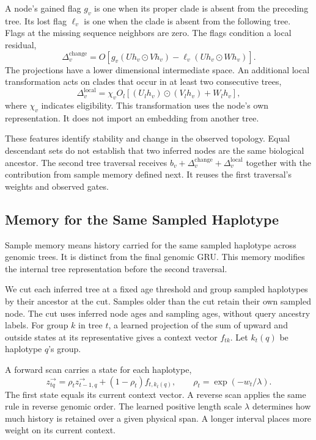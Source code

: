 \documentclass[letterpaper]{article}
\begin{document}
A node's gained flag $g_v$ is one when its proper clade is absent from the preceding tree. Its lost flag $\ell_v$ is one when the clade is absent from the following tree. Flags at the missing sequence neighbors are zero. The flags condition a local residual,
\begin{equation}
\Delta_v^{\mathrm{change}}=
O\!\left[
g_v(Uh_v\odot Vh_v)
-\ell_v(Uh_v\odot Wh_v)
\right].
\label{eq:change}
\end{equation}
The projections have a lower dimensional intermediate space. An additional local transformation acts on clades that occur in at least two consecutive trees,
\begin{equation}
\Delta_v^{\mathrm{local}}=
\chi_v O_l\!\left[(U_lh_v)\odot(V_lh_v)+W_lh_v\right],
\label{eq:local}
\end{equation}
where $\chi_v$ indicates eligibility. This transformation uses the node's own representation. It does not import an embedding from another tree.

These features identify stability and change in the observed topology. Equal descendant sets do not establish that two inferred nodes are the same biological ancestor. The second tree traversal receives $b_v+\Delta_v^{\mathrm{change}}+\Delta_v^{\mathrm{local}}$ together with the contribution from sample memory defined next. It reuses the first traversal's weights and observed gates.

\subsection{Memory for the Same Sampled Haplotype}
Sample memory means history carried for the same sampled haplotype across genomic trees. It is distinct from the final genomic GRU. This memory modifies the internal tree representation before the second traversal.

We cut each inferred tree at a fixed age threshold and group sampled haplotypes by their ancestor at the cut. Samples older than the cut retain their own sampled node. The cut uses inferred node ages and sampling ages, without query ancestry labels. For group $k$ in tree $t$, a learned projection of the sum of upward and outside states at its representative gives a context vector $f_{tk}$. Let $k_t(q)$ be haplotype $q$'s group.

A forward scan carries a state for each haplotype,
\begin{equation}
z^\rightarrow_{tq}
=\rho_t z^\rightarrow_{t-1,q}
 +(1-\rho_t)f_{t,k_t(q)},
\qquad
\rho_t=\exp(-w_t/\lambda).
\label{eq:memory}
\end{equation}
The first state equals its current context vector. A reverse scan applies the same rule in reverse genomic order. The learned positive length scale $\lambda$ determines how much history is retained over a given physical span. A longer interval places more weight on its current context.
\end{document}
